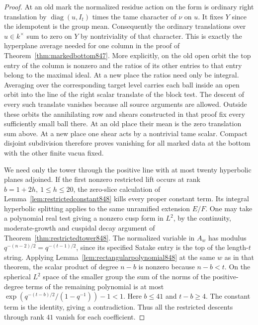 \documentclass[a4paper,11pt]{article}
\theoremstyle{definition}
\theoremstyle{remark}
\numberwithin{equation}{section}
\begin{document}
\begin{proof}
At an old mark the normalized residue action on the form is
ordinary right translation by \(\operatorname{diag}(u,I_t)\)
times the tame character of \(\nu\) on \(u\). It fixes \(Y\)
since the idempotent is the group mean. Consequently the
ordinary translations over \(u\in k^\times\) sum to zero on
\(Y\) by nontriviality of that character. This is exactly the
hyperplane average needed for one column in the proof of
Theorem~\ref{thm:markedbottom847}. More explicitly, on the
old open orbit the top entry of the column is nonzero and the
ratios of its other entries to that entry belong to the maximal
ideal. At a new place the ratios need only be integral.
Averaging over the corresponding target level carries each ball
inside an open orbit into the line of the right scalar translate
of the block test. The descent of every such translate vanishes
because all source arguments are allowed. Outside these orbits
the annihilating row and shears constructed in that proof
fix every sufficiently small ball there. At an old place their
mean is the zero translation sum above. At a new place one shear
acts by a nontrivial tame scalar. Compact disjoint subdivision
therefore proves vanishing for all marked data at the bottom
with the other finite vacua fixed.

We need only the tower through the positive line with at most
twenty hyperbolic planes adjoined. If the first nonzero
restricted lift occurs at rank \(b=1+2h,\ 1\le h\le20\), the
zero-slice calculation of Lemma~\ref{lem:restrictedconstant848}
kills every proper constant term. Its integral hyperbolic
splitting applies to the same unramified extension \(E/F\).
One may take a polynomial real test giving a nonzero cusp
form in \(L^2\), by the continuity, moderate-growth and
cuspidal decay argument of Theorem~\ref{thm:restrictedtower848}.
The normalized variable in \(A_w\) has modulus
\(q^{-(n-2)/2}=q^{-(t-1)/2}\), since its specified Satake
entry is the top of the length-\(t\) string. Applying
Lemma~\ref{lem:rectangularpolynomial848} at the same \(w\)
as in that theorem, the scalar product of degree \(n-b\) is
nonzero because \(n-b<t\). On the spherical \(L^2\) space of
the smaller group the sum of the norms of the positive-degree
terms of the remaining polynomial is at most
\(\exp(q^{-(t-b)/2}/(1-q^{-1}))-1<1\). Here \(b\le41\) and
\(t-b\ge4\). The constant term is the identity, giving a
contradiction. Thus all the restricted descents through
rank \(41\) vanish for each coefficient.


\end{proof}
\end{document}

